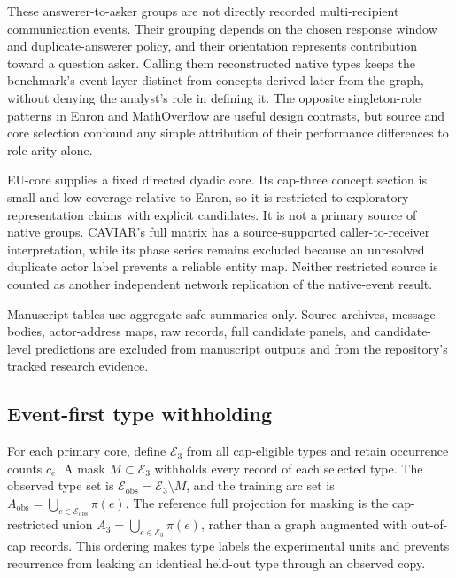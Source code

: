 \documentclass[10pt]{article}
\begin{document}
These answerer-to-asker groups are not directly recorded multi-recipient communication events. Their grouping depends on the chosen response window and duplicate-answerer policy, and their orientation represents contribution toward a question asker. Calling them reconstructed native types keeps the benchmark's event layer distinct from concepts derived later from the graph, without denying the analyst's role in defining it. The opposite singleton-role patterns in Enron and MathOverflow are useful design contrasts, but source and core selection confound any simple attribution of their performance differences to role arity alone.

EU-core supplies a fixed directed dyadic core. Its cap-three concept section is small and low-coverage relative to Enron, so it is restricted to exploratory representation claims with explicit candidates. It is not a primary source of native groups. CAVIAR's full matrix has a source-supported caller-to-receiver interpretation, while its phase series remains excluded because an unresolved duplicate actor label prevents a reliable entity map. Neither restricted source is counted as another independent network replication of the native-event result.

Manuscript tables use aggregate-safe summaries only. Source archives, message bodies, actor-address maps, raw records, full candidate panels, and candidate-level predictions are excluded from manuscript outputs and from the repository's tracked research evidence.

\subsection{Event-first type withholding}
For each primary core, define $\mathcal E_3$ from all cap-eligible types and retain occurrence counts $c_e$. A mask $M\subset\mathcal E_3$ withholds every record of each selected type. The observed type set is $\mathcal E_{\mathrm{obs}}=\mathcal E_3\setminus M$, and the training arc set is $A_{\mathrm{obs}}=\bigcup_{e\in\mathcal E_{\mathrm{obs}}}\pi(e)$. The reference full projection for masking is the cap-restricted union $A_3=\bigcup_{e\in\mathcal E_3}\pi(e)$, rather than a graph augmented with out-of-cap records. This ordering makes type labels the experimental units and prevents recurrence from leaking an identical held-out type through an observed copy.
\end{document}

